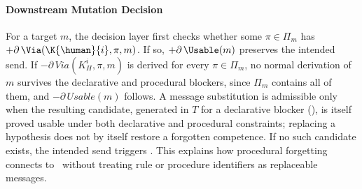 \paragraph{Downstream Mutation Decision}

For a target $m$, the decision layer first checks whether some $\pi\in\Pi_m$ has $+\partial\,\Via(\K{\human}{i},\pi,m)$. If so, $+\partial\,\Usable(m)$ preserves the intended send. If $-\partial\,\mathit{Via}(K^i_H,\pi,m)$ is derived for every $\pi\in\Pi_m$, no normal derivation of $m$ survives the declarative and procedural blockers, since $\Pi_m$ contains all of them, and $-\partial\,\mathit{Usable}(m)$ follows. A message substitution is admissible only when the resulting candidate, generated in $T$ for a declarative blocker (), is itself proved usable under both declarative and procedural constraints; replacing a hypothesis does not by itself restore a forgotten competence. If no such candidate exists, the intended send triggers \skipmutation{}. This explains how procedural forgetting connects to~ without treating rule or procedure identifiers as replaceable messages.

